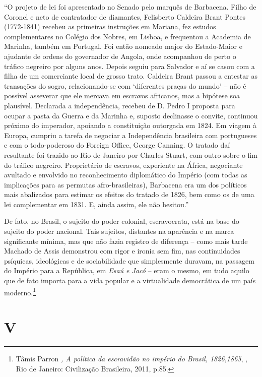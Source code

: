 ``O projeto de lei foi apresentado no Senado pelo marquês de Barbacena.
Filho de Coronel e neto de contratador de diamantes, Felisberto Caldeira
Brant Pontes (1772-1841) recebeu as primeiras instruções em Mariana, fez
estudos complementares no Colégio dos Nobres, em Lisboa, e frequentou a
Academia de Marinha, também em Portugal. Foi então nomeado major do
Estado-Maior e ajudante de ordens do governador de Angola, onde
acompanhou de perto o tráfico negreiro por alguns anos. Depois seguiu
para Salvador e aí se casou com a filha de um comerciante local de
grosso trato. Caldeira Brant passou a entestar as transações do sogro,
relacionando-se com `diferentes praças do mundo' -- não é possível
asseverar que ele mercava em escravos africanos, mas a hipótese soa
plausível. Declarada a independência, recebeu de D. Pedro I proposta
para ocupar a pasta da Guerra e da Marinha e, suposto declinasse o
convite, continuou próximo do imperador, apoiando a constituição
outorgada em 1824. Em viagem à Europa, cumpriu a tarefa de negociar a
Independência brasileira com portugueses e com o todo-poderoso do
Foreign Office, George Canning. O tratado daí resultante foi trazido ao
Rio de Janeiro por Charles Stuart, com outro sobre o fim do tráfico
negreiro. Proprietário de escravos, experiente na África, negociante
avultado e envolvido no reconhecimento diplomático do Império (com todas
as implicações para as permutas afro-brasileiras), Barbacena era um dos
políticos mais abalizados para estimar os efeitos do tratado de 1826,
bem como os de uma lei complementar em 1831. E, ainda assim, ele não
hesitou.''

De fato, no Brasil, o sujeito do poder colonial, escravocrata, está na
base do sujeito do poder nacional. Tais sujeitos, distantes na aparência
e na marca significante mínima, mas que não fazia registro de diferença
-- como mais tarde Machado de Assis demonstrou com rigor e ironia sem
fim, nas continuidades psíquicas, ideológicas e de sociabilidade que
simplesmente duravam, na passagem do Império para a República, em
\emph{Esaú e Jacó} -- eram o mesmo, em tudo aquilo que de fato importa
para a vida popular e a virtualidade democrática de um país
moderno.\footnote{Tâmis Parron \emph{, A política da escravidão no
  império do Brasil, 1826,1865}, , Rio de Janeiro: Civilização
  Brasileira, 2011, p.85.}

\section{V}

